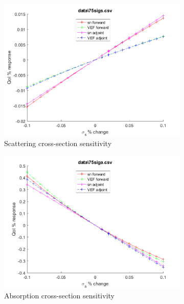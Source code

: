 \documentclass{article}
\begin{document}
\begin{figure}[H]
\begin{subfigure}{.5\textwidth}
  \includegraphics[width=.98\linewidth]{IanProposal/figures2/75sigsSens.png}
  \caption{Scattering cross-section sensitivity}
  \label{fig:sfig2}
\end{subfigure}%
\begin{subfigure}{.5\textwidth}
  \centering
  \includegraphics[width=.98\linewidth]{IanProposal/figures2/75sigaSens.png}
  \caption{Absorption cross-section sensitivity}
  \label{fig:sfig5}
\end{subfigure}%
\caption{}
\label{fig:fig}
\end{figure}
\newpage

\end{document}
